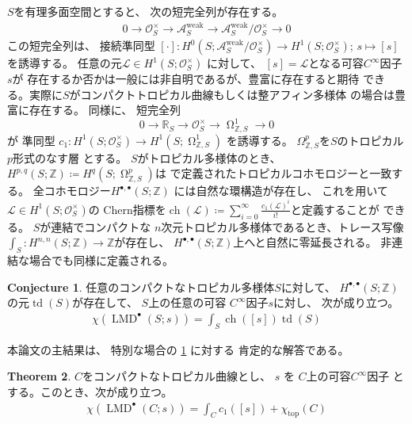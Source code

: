 \documentclass[uplatex,dvipdfmx,12pt]{jsarticle}
\numberwithin{equation}{section}
\theoremstyle{definition}
\newtheorem{theorem}{Theorem}[section]
\newtheorem{conjecture}[theorem]{Conjecture}
\newcommand{\deq}{\coloneqq}
\newcommand{\opn}[1]{\operatorname{#1}}
\DeclareMathOperator{\tform}{\Omega}
\begin{document}
$S$を有理多面空間とすると、
次の短完全列が存在する。
\begin{align}
0\to \mathcal{O}_S^{\times} \to 
\mathcal{A}^{\mathrm{weak}}_S \to 
\mathcal{A}^{\mathrm{weak}}_S/\mathcal{O}_S^{\times}
\to 0
\end{align}
この短完全列は、
接続準同型
$
[\cdot] \colon 
H^{0}(S;\mathcal{A}^{\mathrm{weak}}_S/\mathcal{O}_S^{\times})
\to H^{1}(S;\mathcal{O}_S^{\times})
$;
$
s\mapsto [s]
$
を誘導する。
任意の元$\mathcal{L}\in H^{1}(S;\mathcal{O}^{\times}_S)$
に対して、
$[s]=\mathcal{L}$となる可容$C^{\infty}$因子
$s$が
存在するか否かは一般には非自明であるが、豊富に存在すると期待
できる。実際に$S$がコンパクトトロピカル曲線もしくは整アフィン多様体
の場合は豊富に存在する。
同様に、
短完全列
\begin{equation}
0
\to \mathbb{R}_S
\to \mathcal{O}^{\times}_S
\to \tform_{\mathbb{Z},S}^{1}
\to 0
\end{equation}
が
準同型
$
c_1\colon H^{1}(S;\mathcal{O}^{\times}_S)
\to H^{1}(S;\tform_{\mathbb{Z},S}^{1})
$
を誘導する。
$\Omega_{\mathbb{Z},S}^{p}$を$S$のトロピカル$p$形式のなす層
とする\cite{gross2019sheaftheoretic}。
$S$がトロピカル多様体のとき、
$H^{p,q}(S;\mathbb{Z})\deq H^{q}(S;\tform_{\mathbb{Z},S}^{p})$は
\cite{mikhalkinTropicalEigenwaveIntermediate2014a}
で定義されたトロピカルコホモロジーと一致する。
全コホモロジー$H^{\bullet,\bullet}(S;\mathbb{Z})$
には自然な環構造が存在し、
これを用いて
$\mathcal{L}\in H^{1}(S;\mathcal{O}_S^{\times})$の
Chern指標を$\opn{ch}(\mathcal{L})\deq
\sum_{i=0}^{\infty}\frac{c_1(\mathcal{L})^{i}}{i!}$と定義することが
できる。
$S$が連結でコンパクトな
$n$次元トロピカル多様体であるとき、トレース写像
$\int_{S}\colon H^{n,n}(S;\mathbb{Z})\to \mathbb{Z}$が存在し、
$H^{\bullet,\bullet}(S;\mathbb{Z})$上へと自然に零延長される。
非連結な場合でも同様に定義される。
\setcounter{section}{1}
\setcounter{condition}{1}
\begin{conjecture} \label{conjecture-mirror-tropical-rr}
任意のコンパクトなトロピカル多様体$S$に対して、
$H^{\bullet,\bullet}(S;\mathbb{Z})$
の元$\opn{td}(S)$が存在して、
$S$上の任意の可容
$C^{\infty}$因子$s$に対し、
次が成り立つ。
\begin{align}
\chi(\opn{LMD}^{\bullet}(S;s))=
\int_{S}\opn{ch}([s])\opn{td}(S)
\end{align}
\end{conjecture}


本論文の主結果は、
特別な場合の
\cref{conjecture-mirror-tropical-rr}
に対する
肯定的な解答である。

\begin{theorem} \label{theorem-main-1}
$C$をコンパクトなトロピカル曲線とし、
$s$ を $C$上の可容$C^{\infty}$因子 
とする。このとき、次が成り立つ。
\begin{align}
\chi(\opn{LMD}^{\bullet}(C;s))=\int_C c_1([s])+
\chi_{\opn{top}}(C)
\end{align}
\end{theorem}
\end{document}
